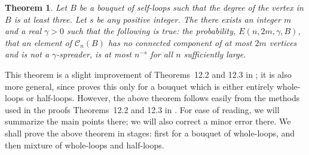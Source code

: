 \documentclass{memo-l}
\theoremstyle{plain}
\newtheorem{theorem}{Theorem}[section]
\theoremstyle{definition}
\numberwithin{section}{chapter}
\numberwithin{equation}{chapter}
\theoremstyle{plain}
\theoremstyle{definition}
\newcommand\cC{\mathcal{C}}
\begin{document}
\begin{theorem} 
\label{th:spreader_power}
Let $B$ be a bouquet of self-loops such that the degree of the vertex in
$B$ is at least three.  Let $s$ be any positive integer.
The there exists an integer $m$ and a real $\gamma>0$ such that the 
following is true:
the probability, $E(n,2m,\gamma,B)$,
that an element of $\cC_n(B)$ has no connected component of
at most $2m$ vertices and is not a $\gamma$-spreader, is at most
$n^{-s}$ for all $n$ sufficiently large.
\end{theorem}

This theorem is a slight improvement of
Theorems~12.2 and 12.3 in \cite{friedman_alon}; it is also more general,
since \cite{friedman_alon} proves this only for a bouquet which is 
either entirely whole-loops or half-loops.  However, the above theorem
follows easily from the methods used in the proofs 
Theorems~12.2 and 12.3 in
\cite{friedman_alon}.
For ease of reading, we will summarize the main points there; we will
also correct
a minor error there.
We shall prove the above theorem in stages: first for a bouquet of
whole-loops, and then mixture of whole-loops and half-loops.
\end{document}
